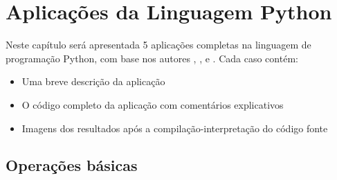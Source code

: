 


\chapter{ Aplica\c{c}\~{o}es da Linguagem Python}

Neste capítulo será apresentada 5 aplicações completas na linguagem de programação Python, com base nos autores \cite{Perkovic2016}, \cite{Borges2014}, \cite{Severance2016} e \cite{Lutz2007}. Cada caso contém:
\begin{itemize}
  \item Uma breve descrição da aplicação
  \item O código completo da aplicação com comentários explicativos
  \item Imagens dos resultados após a compilação-interpretação do código fonte
\end{itemize}




    \section{Operações básicas}
    
